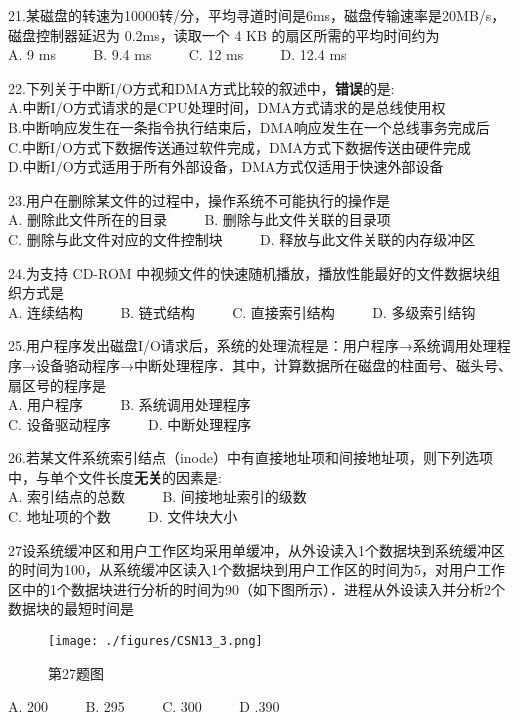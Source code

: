 21.某磁盘的转速为10000转/分，平均寻道时间是6ms，磁盘传输速率是20MB/s，磁盘控制器延迟为 0.2ms，读取一个 4 KB 的扇区所需的平均时间约为 \\
A. 9 ms $\qquad$ B. 9.4 ms $\qquad$ C. 12 ms $\qquad$ D. 12.4 ms

22.下列关于中断I/O方式和DMA方式比较的叙述中，\textbf{错误}的是: \\
A.中断I/O方式请求的是CPU处理时间，DMA方式请求的是总线使用权 \\
B.中断响应发生在一条指令执行结束后，DMA响应发生在一个总线事务完成后 \\
C.中断I/O方式下数据传送通过软件完成，DMA方式下数据传送由硬件完成 \\
D.中断I/O方式适用于所有外部设备，DMA方式仅适用于快速外部设备

23.用户在删除某文件的过程中，操作系统不可能执行的操作是 \\
A. 删除此文件所在的目录 $\qquad$ B. 删除与此文件关联的目录项 \\
C. 删除与此文件对应的文件控制块 $\qquad$ D. 释放与此文件关联的内存级冲区

24.为支持 CD-ROM 中视频文件的快速随机播放，播放性能最好的文件数据块组织方式是 \\
A. 连续结构 $\qquad$ B. 链式结构 $\qquad$ C. 直接索引结构 $\qquad$ D. 多级索引结钩

25.用户程序发出磁盘I/O请求后，系统的处理流程是：用户程序→系统调用处理程序→设备骆动程序→中断处理程序．其中，计算数据所在磁盘的柱面号、磁头号、扇区号的程序是 \\
A. 用户程序 $\qquad$ B. 系统调用处理程序 \\
C. 设备驱动程序 $\qquad$ D. 中断处理程序

26.若某文件系统索引结点（inode）中有直接地址项和间接地址项，则下列选项中，与单个文件长度\textbf{无关}的因素是: \\
A. 索引结点的总数 $\qquad$ B. 间接地址索引的级数 \\
C. 地址项的个数 $\qquad$ D. 文件块大小

27设系统缓冲区和用户工作区均采用单缓冲，从外设读入1个数据块到系统缓冲区的时间为100，从系统缓冲区读入1个数据块到用户工作区的时间为5，对用户工作区中的1个数据块进行分析的时间为90（如下图所示）．进程从外设读入并分析2个数据块的最短时间是 \\
\begin{figure}[ht]
\centering
\texttt{[image: ./figures/CSN13\_3.png]}
\caption{第27题图} \label{CSN13_fig3}
\end{figure}
A. 200 $\qquad$ B. 295 $\qquad$ C. 300 $\qquad$ D .390


